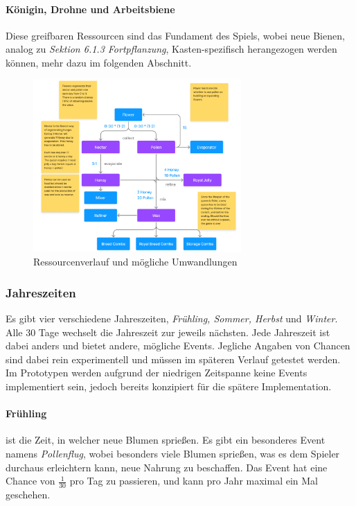 \paragraph{Königin, Drohne und Arbeitsbiene}
Diese greifbaren Ressourcen sind das Fundament des Spiels, wobei neue Bienen, analog zu \textit{Sektion 6.1.3 Fortpflanzung}, Kasten-spezifisch herangezogen werden können, mehr dazu im folgenden Abschnitt.

\begin{figure}
    \begin{center}
        \includegraphics[width=300px]{0.bilder/resourceloop.png}
    \end{center}
    \caption{Ressourcenverlauf und mögliche Umwandlungen} \label{image:resourceloop}
\end{figure}

\subsubsection{Jahreszeiten}
Es gibt vier verschiedene Jahreszeiten, \textit{Frühling, Sommer, Herbst} und \textit{Winter}. Alle 30 Tage wechselt die Jahreszeit zur jeweils nächsten. Jede Jahreszeit ist dabei anders und bietet andere, mögliche Events. Jegliche Angaben von Chancen sind dabei rein experimentell und müssen im späteren Verlauf getestet werden. Im Prototypen werden aufgrund der niedrigen Zeitspanne keine Events implementiert sein, jedoch bereits konzipiert für die spätere Implementation.

\paragraph{Frühling} ist die Zeit, in welcher neue Blumen sprießen. Es gibt ein besonderes Event namens \textit{Pollenflug}, wobei besonders viele Blumen sprießen, was es dem Spieler durchaus erleichtern kann, neue Nahrung zu beschaffen. Das Event hat eine Chance von $\frac{1}{30}$ pro Tag zu passieren, und kann pro Jahr maximal ein Mal geschehen.

